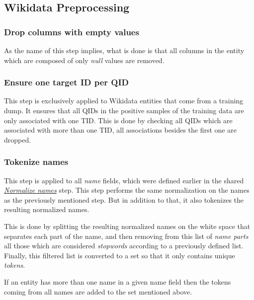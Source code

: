\documentclass[epsfig,a4paper,11pt,titlepage,twoside,openany]{book}
\begin{document}
\subsection{Wikidata Preprocessing}
\label{sec:data-preprocessing-wikidata}

\subsubsection{Drop columns with empty values}
\label{sec:data-preprocessiong-wik-drop-empty}

As the name of this step implies, what is done is that all columns in the entity which are composed of only \textit{null} values are removed. 

\subsubsection{Ensure one target ID per QID}
\label{sec:data-preprocessiong-name-one-tid}

This step is exclusively applied to Wikidata entities that come from a training dump. It ensures that all QIDs in the positive samples of the training data are only associated with one TID. This is done by checking all QIDs which are associated with more than one TID, all associations besides the first one are dropped. 

\subsubsection{Tokenize names}
\label{sec:data-preprocessiong-wik-name-tokenization}

This step is applied to all \textit{name} fields, which were defined earlier in the shared \hyperref[sec:data-preprocessiong-name-normalization]{\textit{Normalize names}} step. This step performs the same normalization on the names as the previously mentioned step. But in addition to that, it also tokenizes the resulting normalized names. 

This is done by splitting the resulting normalized names on the white space that separates each part of the name, and then removing from this list of \textit{name parts} all those which are considered \textit{stopwords} according to a previously defined list. Finally, this filtered list is converted to a set so that it only contains unique \textit{tokens}. 

If an entity has more than one name in a given name field then the tokens coming from all names are added to the set mentioned above. 
\end{document}
